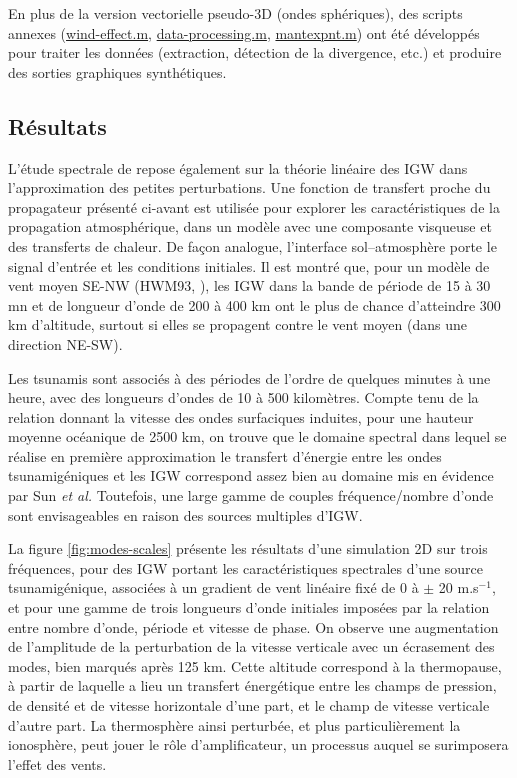 En plus de la version vectorielle pseudo-3D (ondes sphériques), des scripts annexes (\hyperref{annexe:A:windeffect.m}{}{}{wind-effect.m}, \hyperref{annexe:A:dataprocessing.m}{}{}{data-processing.m}, \hyperref{annexe:A:mantexpnt.m}{}{}{mantexpnt.m}) ont été développés pour traiter les données (extraction, détection de la divergence, etc.) et produire des sorties graphiques synthétiques.


\subsection{Résultats}

L'étude spectrale de \cite{Sun2007} repose également sur la théorie linéaire des IGW dans l'approximation des petites perturbations. Une fonction de transfert proche du propagateur présenté ci-avant est utilisée pour explorer les caractéristiques de la propagation atmosphérique, dans un modèle avec une composante visqueuse et des transferts de chaleur. De façon analogue, l'interface sol--atmosphère porte le signal d'entrée et les conditions initiales. Il est montré que, pour un modèle de vent moyen SE-NW (HWM93, \cite{Hedin1991}), les IGW dans la bande de période de 15 à 30 mn et de longueur d'onde de 200 à 400 km ont le plus de chance d'atteindre 300 km d'altitude, surtout si elles se propagent contre le vent moyen (\ie dans une direction NE-SW).

Les tsunamis sont associés à des périodes de l'ordre de quelques minutes à une heure, avec des longueurs d'ondes de 10 à 500 kilomètres. Compte tenu de la relation donnant la vitesse des ondes surfaciques induites, pour une hauteur moyenne océanique de 2500 km, on trouve que le domaine spectral dans lequel se réalise en première approximation le transfert d'énergie entre les ondes tsunamigéniques et les IGW correspond assez bien au domaine mis en évidence par Sun \emph{et al.} Toutefois, une large gamme de couples fréquence/nombre d'onde sont envisageables en raison des sources multiples d'IGW.

La figure \ref{fig:modes-scales} présente les résultats d'une simulation 2D sur trois fréquences, pour des IGW portant les caractéristiques spectrales d'une source tsunamigénique, associées à un gradient de vent linéaire fixé de 0 à $\pm$ 20 m.s$^{-1}$, et pour une gamme de trois longueurs d'onde initiales imposées par la relation entre nombre d'onde, période et vitesse de phase. On observe une augmentation de l'amplitude de la perturbation de la vitesse verticale avec un écrasement des modes, bien marqués après 125 km. Cette altitude correspond à la thermopause, à partir de laquelle a lieu un transfert énergétique entre les champs de pression, de densité et de vitesse horizontale d'une part, et le champ de vitesse verticale d'autre part. La thermosphère ainsi perturbée, et plus particulièrement la ionosphère, peut jouer le rôle d'amplificateur, un processus auquel se surimposera l'effet des vents. 

